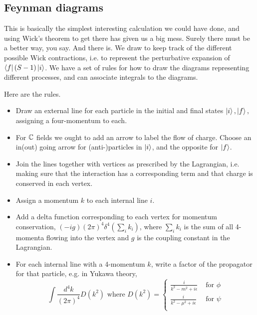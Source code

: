 
\subsection*{Feynman diagrams} This is basically the simplest interesting calculation we could have done, and using Wick's theorem to get there has given us a big mess. Surely there must be a better way, you say. And there is. We draw  to keep track of the different possible Wick contractions, i.e. to represent the perturbative expansion of $\left< f \right|(S-1)\left| i \right>$. We have a set of rules for how to draw the diagrams representing different processes, and can associate integrals to the diagrams.

Here are the rules.
\begin{itemize}
    \item Draw an external line for each particle in the initial and final states $\left| i \right>,\left| f \right>,$ assigning a four-momentum to each. 
    \item For $\mathbb{C}$ fields we ought to add an arrow to label the flow of charge. Choose an in(out) going arrow for (anti-)particles in $\left| i \right>$, and the opposite for $\left| f \right>$.
    \item Join the lines together with vertices as prescribed by the Lagrangian, i.e. making sure that the interaction has a corresponding term and that charge is conserved in each vertex.
    \item Assign a momentum $k$ to each internal line $i$.
    \item Add a delta function corresponding to each vertex for momentum conservation, $(-ig)(2\pi)^4 \delta^4(\sum_i k_i)$, where $\sum_i k_i$ is the sum of all 4-momenta flowing into the vertex and $g$ is the coupling constant in the Lagrangian.
    \item For each internal line with a 4-momentum $k$, write a factor of the propagator for that particle, e.g. in Yukawa theory,
    $$\int \frac{d^4k}{(2\pi)^4} D(k^2)\text{ where }D(k^2)=\begin{cases}
    \frac{i}{k^2-m^2+i\epsilon} & \text{ for }\phi\\
    \frac{i}{k^2-\mu^2+i\epsilon} & \text{ for }\psi\\
    \end{cases}$$
\end{itemize}

